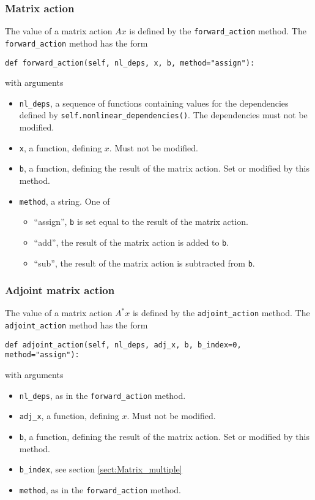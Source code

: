 \documentclass[11pt]{article}
\begin{document}
\subsubsection{Matrix action}

The value of a matrix action $A x$ is defined by the \texttt{forward\_action}
method. The \texttt{forward\_action} method has the form
\begin{lstlisting}
def forward_action(self, nl_deps, x, b, method="assign"):
\end{lstlisting}
with arguments
\begin{itemize}
  \item \texttt{nl\_deps}, a sequence of functions containing values for the
    dependencies defined by \texttt{self.nonlinear\_dependencies()}. The
    dependencies must not be modified.
  \item \texttt{x}, a function, defining $x$. Must not be modified.
  \item \texttt{b}, a function, defining the result of the matrix action. Set
    or modified by this method.
  \item \texttt{method}, a string. One of
  \begin{itemize}
    \item ``assign'', \texttt{b} is set equal to the result of the matrix
      action.
    \item ``add'', the result of the matrix action is added to \texttt{b}.
    \item ``sub'', the result of the matrix action is subtracted from
      \texttt{b}.
  \end{itemize}
\end{itemize}

\subsubsection{Adjoint matrix action}

The value of a matrix action $A^* x$ is defined by the
\texttt{adjoint\_action} method. The \texttt{adjoint\_action} method has the
form
\begin{lstlisting}
def adjoint_action(self, nl_deps, adj_x, b, b_index=0, method="assign"):
\end{lstlisting}
with arguments
\begin{itemize}
  \item \texttt{nl\_deps}, as in the \texttt{forward\_action} method.
  \item \texttt{adj\_x}, a function, defining $x$. Must not be modified.
  \item \texttt{b}, a function, defining the result of the matrix action. Set
    or modified by this method.
  \item \texttt{b\_index}, see section \ref{sect:Matrix_multiple}
  \item \texttt{method}, as in the \texttt{forward\_action} method.
\end{itemize}
\end{document}
